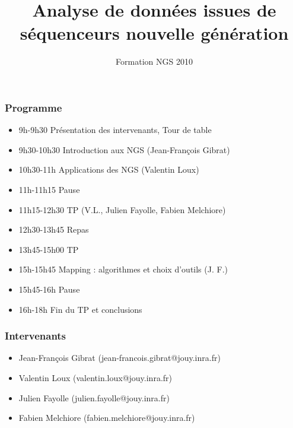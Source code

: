 \documentclass{beamer}
\title[NGS] %
{Analyse de données issues de séquenceurs nouvelle génération}
\institute[INRA-MIG] %
{
  Unité Mathématique, Informatique et Génome\\
  INRA, Jouy en Josas
}
\date[25 Novembre 2010] %
{Formation NGS 2010}
\begin{document}
	
	
\begin{frame}
  \titlepage
\end{frame}

\begin{frame}
  \frametitle{Programme}
  \tableofcontents

\begin{itemize}
	\item 9h-9h30 Présentation des intervenants, Tour de table
	\item 9h30-10h30 Introduction aux NGS (Jean-François Gibrat)
	\item 10h30-11h Applications des NGS (Valentin Loux)
	\item 11h-11h15 Pause
	\item 11h15-12h30 TP (V.L., Julien Fayolle, Fabien Melchiore)
	\item 12h30-13h45 Repas
	\item 13h45-15h00 TP
	\item 15h-15h45 Mapping : algorithmes et choix d'outils (J. F.)
	\item 15h45-16h Pause
	\item 16h-18h Fin du TP et conclusions
\end{itemize}
\end{frame}


\begin{frame}
	\frametitle{Intervenants}
\begin{itemize}
	\item Jean-François Gibrat (jean-francois.gibrat@jouy.inra.fr)
	\item Valentin Loux (valentin.loux@jouy.inra.fr)
	\item Julien Fayolle (julien.fayolle@jouy.inra.fr)
	\item Fabien Melchiore (fabien.melchiore@jouy.inra.fr) 
\end{itemize}
\end{frame}
\end{document}
